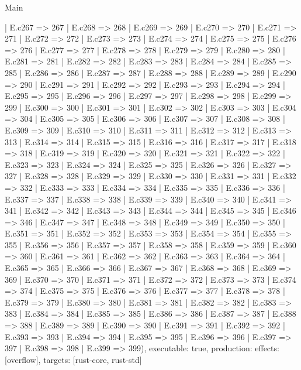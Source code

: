 \begin{lexlean}{Main}
\begin{semanticmodule}
{    | E.c267 => 267
    | E.c268 => 268
    | E.c269 => 269
    | E.c270 => 270
    | E.c271 => 271
    | E.c272 => 272
    | E.c273 => 273
    | E.c274 => 274
    | E.c275 => 275
    | E.c276 => 276
    | E.c277 => 277
    | E.c278 => 278
    | E.c279 => 279
    | E.c280 => 280
    | E.c281 => 281
    | E.c282 => 282
    | E.c283 => 283
    | E.c284 => 284
    | E.c285 => 285
    | E.c286 => 286
    | E.c287 => 287
    | E.c288 => 288
    | E.c289 => 289
    | E.c290 => 290
    | E.c291 => 291
    | E.c292 => 292
    | E.c293 => 293
    | E.c294 => 294
    | E.c295 => 295
    | E.c296 => 296
    | E.c297 => 297
    | E.c298 => 298
    | E.c299 => 299
    | E.c300 => 300
    | E.c301 => 301
    | E.c302 => 302
    | E.c303 => 303
    | E.c304 => 304
    | E.c305 => 305
    | E.c306 => 306
    | E.c307 => 307
    | E.c308 => 308
    | E.c309 => 309
    | E.c310 => 310
    | E.c311 => 311
    | E.c312 => 312
    | E.c313 => 313
    | E.c314 => 314
    | E.c315 => 315
    | E.c316 => 316
    | E.c317 => 317
    | E.c318 => 318
    | E.c319 => 319
    | E.c320 => 320
    | E.c321 => 321
    | E.c322 => 322
    | E.c323 => 323
    | E.c324 => 324
    | E.c325 => 325
    | E.c326 => 326
    | E.c327 => 327
    | E.c328 => 328
    | E.c329 => 329
    | E.c330 => 330
    | E.c331 => 331
    | E.c332 => 332
    | E.c333 => 333
    | E.c334 => 334
    | E.c335 => 335
    | E.c336 => 336
    | E.c337 => 337
    | E.c338 => 338
    | E.c339 => 339
    | E.c340 => 340
    | E.c341 => 341
    | E.c342 => 342
    | E.c343 => 343
    | E.c344 => 344
    | E.c345 => 345
    | E.c346 => 346
    | E.c347 => 347
    | E.c348 => 348
    | E.c349 => 349
    | E.c350 => 350
    | E.c351 => 351
    | E.c352 => 352
    | E.c353 => 353
    | E.c354 => 354
    | E.c355 => 355
    | E.c356 => 356
    | E.c357 => 357
    | E.c358 => 358
    | E.c359 => 359
    | E.c360 => 360
    | E.c361 => 361
    | E.c362 => 362
    | E.c363 => 363
    | E.c364 => 364
    | E.c365 => 365
    | E.c366 => 366
    | E.c367 => 367
    | E.c368 => 368
    | E.c369 => 369
    | E.c370 => 370
    | E.c371 => 371
    | E.c372 => 372
    | E.c373 => 373
    | E.c374 => 374
    | E.c375 => 375
    | E.c376 => 376
    | E.c377 => 377
    | E.c378 => 378
    | E.c379 => 379
    | E.c380 => 380
    | E.c381 => 381
    | E.c382 => 382
    | E.c383 => 383
    | E.c384 => 384
    | E.c385 => 385
    | E.c386 => 386
    | E.c387 => 387
    | E.c388 => 388
    | E.c389 => 389
    | E.c390 => 390
    | E.c391 => 391
    | E.c392 => 392
    | E.c393 => 393
    | E.c394 => 394
    | E.c395 => 395
    | E.c396 => 396
    | E.c397 => 397
    | E.c398 => 398
    | E.c399 => 399),
  executable: true,
  production: {effects: [overflow], targets: [rust-core, rust-std]}
}
\end{semanticmodule}
\end{lexlean}
